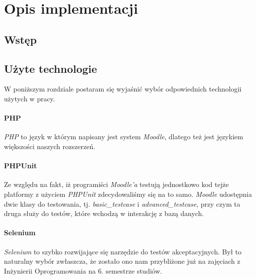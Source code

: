 \chapter{Opis implementacji}
\label{Chapter6}

\section{Wstęp}
\label{Chapter61}

%
\section{Użyte technologie}
\label{Chapter62}

W poniższym rozdziale postaram się wyjaśnić wybór odpowiednich technologii użytych w pracy.
\subsubsection{PHP}
\emph{PHP} to język w którym napisany jest system \emph{Moodle}, dlatego też jest językiem większości naszych rozszerzeń.
\subsubsection{PHPUnit}
Ze względu na fakt, iż programiści \emph{Moodle'a} testują jednostkowo kod tejże platformy z użyciem \emph{PHPUnit} zdecydowaliśmy się na to samo. \emph{Moodle} udostępnia dwie klasy do testowania, tj. \emph{basic\_testcase} i \emph{advanced\_testcase}, przy czym ta druga służy do testów, które wchodzą w interakcję z bazą danych.
\subsubsection{Selenium}
\emph{Selenium} to szybko rozwijające się narzędzie do testów akceptacyjnych. Był to naturalny wybór zwłaszcza, że zostało ono nam przybliżone już na zajęciach z Inżynierii Oprogramowania na 6. semestrze studiów.
